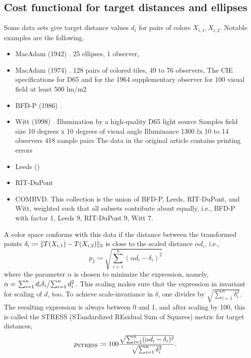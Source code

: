 \documentclass{scrartcl}
\theoremstyle{named}
\DeclarePairedDelimiter{\norm}{\lVert}{\rVert}
\begin{document}
\subsection{Cost functional for target distances and ellipses}

Some data sets give target distance values $d_i$ for pairs of colors $X_{i,1}, X_{i,2}$.
Notable examples are the following.
\begin{itemize}
  \item MacAdam (1942) \cite{macadam1942}.
     25 ellipses,
     1 observer,
  \item MacAdam (1974) \cite{macadam1974}.
     128 pairs of colored tiles,
     49 to 76 observers,
     The CIE specifications for D65 and for the 1964
     supplementary observer for 100 visual field
     at least 500 lm/m2
   \item BFD-P (1986) \cite{luorigg}.

   \item Witt (1998) \cite{witt}.
     Illumination by a high-quality D65 light source
     Samples field size 10 degrees x 10 degrees of visual angle
     Illuminance 1300 lx
     10 to 14 observers
     418 sample pairs
     The data in the original article contains printing errors

  \item Leeds ()

  \item RIT-DuPont

  \item COMBVD.
    This collection is the union of BFD-P, Leeds, RIT-DuPont, and Witt, weighted such
    that all subsets contribute about equally, i.e., BFD-P with factor 1, Leeds 9,
    RIT-DuPont 9, Witt 7.
\end{itemize}

A color space conforms with this data if the distance between the transformed points
$\delta_i \coloneqq \norm{T(X_{i,1}) - T(X_{i,2})}_2$
is close to the scaled distance $\alpha d_i$, i.e.,
\begin{equation}\label{eq:p}
  p_2
  \coloneqq \sqrt{\sum_{i=1}^n (\alpha d_i - \delta_i)^2}
\end{equation}
where the parameter $\alpha$ is chosen to minimize the expression, namely, $\alpha =
\left.\sum_{i=1}^n d_i \delta_i \middle/ \sum_{i=1}^n d_i^2\right.$. This scaling makes
sure that the expression in invariant for scaling of $d$, too. To achieve
scale-invariance in $\delta$, one divides by $\sqrt{\sum_{i=1}^n \delta_i^2}$.  The
resulting expression is always between 0 and 1, and after scaling by 100, this is called
the STRESS (STandardized REsidual Sum of Squares) metric for target distances,
\begin{equation}\label{eq:p}
  p_{\text{STRESS}}
  \coloneqq
  100
  \frac{%
    \sqrt{\sum_{i=1}^n (\alpha d_i - \delta_i)^2}
  }{
    \sqrt{\sum_{i=1}^n \delta_i^2}
  }.
\end{equation}
\end{document}
